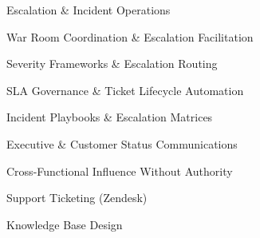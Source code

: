 \begin{skills}{Escalation \& Incident Operations}
    \item War Room Coordination \& Escalation Facilitation
    \item Severity Frameworks \& Escalation Routing
    \item SLA Governance \& Ticket Lifecycle Automation
    \item Incident Playbooks \& Escalation Matrices
    \item Executive \& Customer Status Communications
    \item Cross-Functional Influence Without Authority
    \item Support Ticketing (Zendesk)
    \item Knowledge Base Design
\end{skills}
